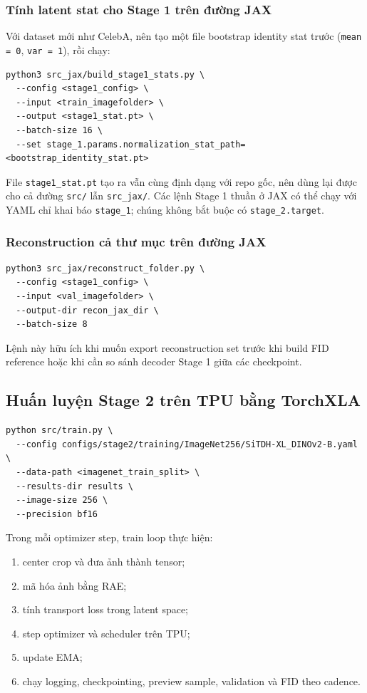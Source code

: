 \subsubsection{Tính latent stat cho Stage 1 trên đường JAX}

Với dataset mới như CelebA, nên tạo một file bootstrap identity stat trước
(\texttt{mean = 0}, \texttt{var = 1}), rồi chạy:

\begin{lstlisting}[style=rae]
python3 src_jax/build_stage1_stats.py \
  --config <stage1_config> \
  --input <train_imagefolder> \
  --output <stage1_stat.pt> \
  --batch-size 16 \
  --set stage_1.params.normalization_stat_path=<bootstrap_identity_stat.pt>
\end{lstlisting}

File \texttt{stage1\_stat.pt} tạo ra vẫn cùng định dạng với repo gốc, nên dùng
lại được cho cả đường \texttt{src/} lẫn \texttt{src\_jax/}.
Các lệnh Stage 1 thuần ở JAX có thể chạy với YAML chỉ khai báo
\texttt{stage\_1}; chúng không bắt buộc có \texttt{stage\_2.target}.

\subsubsection{Reconstruction cả thư mục trên đường JAX}

\begin{lstlisting}[style=rae]
python3 src_jax/reconstruct_folder.py \
  --config <stage1_config> \
  --input <val_imagefolder> \
  --output-dir recon_jax_dir \
  --batch-size 8
\end{lstlisting}

Lệnh này hữu ích khi muốn export reconstruction set trước khi build FID reference
hoặc khi cần so sánh decoder Stage 1 giữa các checkpoint.

\subsection{Huấn luyện Stage 2 trên TPU bằng TorchXLA}

\begin{lstlisting}[style=rae]
python src/train.py \
  --config configs/stage2/training/ImageNet256/SiTDH-XL_DINOv2-B.yaml \
  --data-path <imagenet_train_split> \
  --results-dir results \
  --image-size 256 \
  --precision bf16
\end{lstlisting}

Trong mỗi optimizer step, train loop thực hiện:

\begin{enumerate}[leftmargin=1.8em]
  \item center crop và đưa ảnh thành tensor;
  \item mã hóa ảnh bằng RAE;
  \item tính transport loss trong latent space;
  \item step optimizer và scheduler trên TPU;
  \item update EMA;
  \item chạy logging, checkpointing, preview sample, validation và FID theo cadence.
\end{enumerate}

